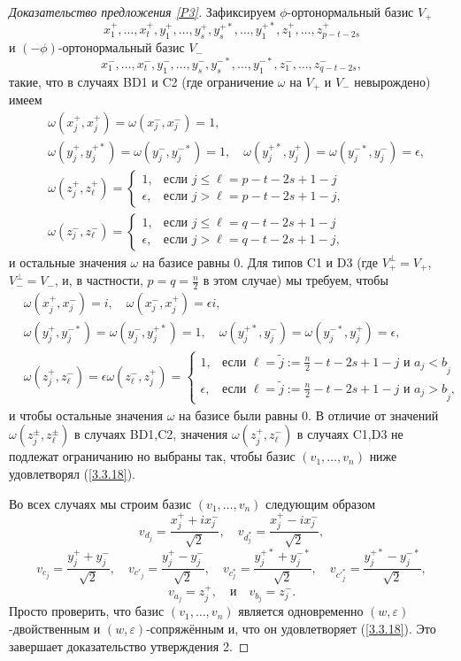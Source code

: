 \documentclass{amsart}
\theoremstyle{definition}
\begin{document}
\begin{proof}[Доказательство предложения \ref{P3}]
Зафиксируем $\phi$-ортонормальный базис $V_+$
\[x_1^+,\ldots,x_t^+,y^+_1,\ldots,y^+_s,y^{+*}_s,\ldots,y^{+*}_1,z^+_1,\ldots,z^+_{p-t-2s}\]
и $(-\phi)$-ортонормальный базис $V_-$
\[x_1^-,\ldots,x_t^-,y^-_1,\ldots,y^-_s,y^{-*}_s,\ldots,y^{-*}_1,z^-_1,\ldots,z^-_{q-t-2s},\]
такие, что в случаях BD1 и C2 (где ограничение $\omega$ на $V_+$ и $V_-$ невырождено)  имеем
\begin{eqnarray*}
 & \omega(x^+_j,x^+_j)=\omega(x^-_j,x^-_j)=1,\\
 & \omega(y^+_j,y^{+*}_j)=\omega(y^-_j,y^{-*}_j)=1,\quad\omega(y^{+*}_j,y^+_j)=\omega(y^{-*}_j,y^-_j)=\epsilon, \\
 & \omega(z^+_j,z^+_{\ell})=\left\{\begin{array}{ll} 1, & \mbox{если $j\leq \ell=p-t-2s+1-j$} \\ \epsilon, & \mbox{если $j>\ell=p-t-2s+1-j, $} \end{array}\right.
\\
 & \omega(z^-_j,z^-_{\ell})=\left\{\begin{array}{ll} 1, & \mbox{если $j\leq \ell=q-t-2s+1-j$} \\ \epsilon, & \mbox{если $j>\ell=q-t-2s+1-j, $} \end{array}\right.
\end{eqnarray*}
и остальные значения $\omega$ на базисе  равны $0$.  Для типов C1 и D3 (где $V_+^\perp=V_+$, $V_-^\perp=V_-$, и, в частности, $p=q=\frac{n}{2}$ в этом случае) мы требуем, чтобы
\begin{eqnarray*}
 & \omega(x^+_j,x^-_j)=i,\quad \omega(x^-_j,x^+_j)=\epsilon i,\\
 & \omega(y^+_j,y^{-*}_j)=\omega(y^-_j,y^{+*}_j)=1,\quad\omega(y^{+*}_j,y^-_j)=\omega(y^{-*}_j,y^+_j)=\epsilon, \\
 & \omega(z^+_j,z^-_{\ell})=\epsilon\omega(z^-_\ell,z^+_j)=\left\{\begin{array}{ll} 1, & \mbox{если $\ell=\tilde{j}:=\frac{n}{2}-t-2s+1-j$ и $a_j<b_{\tilde{j}}$} \\ \epsilon, & \mbox{если $\ell=\tilde{j}:=\frac{n}{2}-t-2s+1-j$ и $a_j>b_{\tilde{j}}$,} \end{array}\right.
\end{eqnarray*}
и чтобы  остальные значения $\omega$ на базисе были равны $0$.
В отличие от значений $\omega(z_j^\pm,z_\ell^\pm)$ в случаях BD1,C2, значения $\omega(z_j^+,z_\ell^-)$ в случаях C1,D3 не подлежат ограничанию но выбраны так, чтобы базис $(v_1,\ldots,v_n)$ ниже удовлетворял (\ref{3.3.18}).

Во всех случаях мы строим базис $(v_1,\ldots,v_n)$ следующим образом
\[v_{d_j}=\frac{x^+_j+ix^-_j}{\sqrt{2}},\quad v_{d_j^*}=\frac{x^+_j-ix^-_j}{\sqrt{2}},\]
\[v_{c_j}=\frac{y^+_j+y^-_j}{\sqrt{2}},\quad v_{c'_j}=\frac{y^+_j-y^-_j}{\sqrt{2}},\quad v_{c^*_j}=\frac{y^{+*}_j+y^{-*}_j}{\sqrt{2}},\quad v_{c'^*_j}=\frac{y^{+*}_j-y^{-*}_j}{\sqrt{2}},\]
\[v_{a_j}=z^+_j,\quad\mbox{и}\quad v_{b_j}=z_j^-.\]
Просто проверить, что базис $(v_1,\ldots,v_n)$ является одновременно $(w,\varepsilon)$-двойственным и $(w,\varepsilon)$-сопряжённым и, что он удовлетворяет (\ref{3.3.18}). Это завершает доказательство утверждения 2.
\end{proof}
\end{document}
